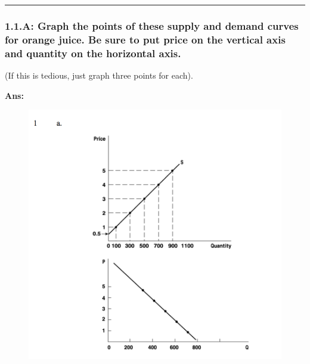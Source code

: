 \documentclass[]{article}
\begin{document}
\begin{center}\rule{0.5\linewidth}{\linethickness}\end{center}

\hypertarget{a-graph-the-points-of-these-supply-and-demand-curves-for-orange-juice.-be-sure-to-put-price-on-the-vertical-axis-and-quantity-on-the-horizontal-axis.}{%
\subsubsection*{1.1.A: Graph the points of these supply and demand
curves for orange juice. Be sure to put price on the vertical axis and
quantity on the horizontal
axis.}\label{a-graph-the-points-of-these-supply-and-demand-curves-for-orange-juice.-be-sure-to-put-price-on-the-vertical-axis-and-quantity-on-the-horizontal-axis.}}

(If this is tedious, just graph three points for each).

\textbf{Ans:}

\begin{figure}

{\centering \includegraphics[width=0.9\linewidth]{ns1a_ans} 

}

\end{figure}
\end{document}
